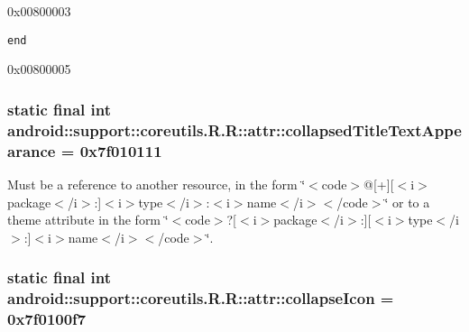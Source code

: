 0x00800003

{\tt end}

0x00800005\hypertarget{classandroid_1_1support_1_1coreutils_1_1_r_1_1attr_ba474768d9b4143779115eefd8dd21f3}{
\subsubsection[{collapsedTitleTextAppearance}]{\setlength{\rightskip}{0pt plus 5cm}static final int android::support::coreutils.R.R::attr::collapsedTitleTextAppearance = 0x7f010111}}
\label{classandroid_1_1support_1_1coreutils_1_1_r_1_1attr_ba474768d9b4143779115eefd8dd21f3}


Must be a reference to another resource, in the form \char`\"{}$<$code$>$@\mbox{[}+\mbox{]}\mbox{[}$<$i$>$package$<$/i$>$:\mbox{]}$<$i$>$type$<$/i$>$:$<$i$>$name$<$/i$>$$<$/code$>$\char`\"{} or to a theme attribute in the form \char`\"{}$<$code$>$?\mbox{[}$<$i$>$package$<$/i$>$:\mbox{]}\mbox{[}$<$i$>$type$<$/i$>$:\mbox{]}$<$i$>$name$<$/i$>$$<$/code$>$\char`\"{}. \hypertarget{classandroid_1_1support_1_1coreutils_1_1_r_1_1attr_bc11a54c31fe152c46baa5973dec82e8}{
\subsubsection[{collapseIcon}]{\setlength{\rightskip}{0pt plus 5cm}static final int android::support::coreutils.R.R::attr::collapseIcon = 0x7f0100f7}}
\label{classandroid_1_1support_1_1coreutils_1_1_r_1_1attr_bc11a54c31fe152c46baa5973dec82e8}



